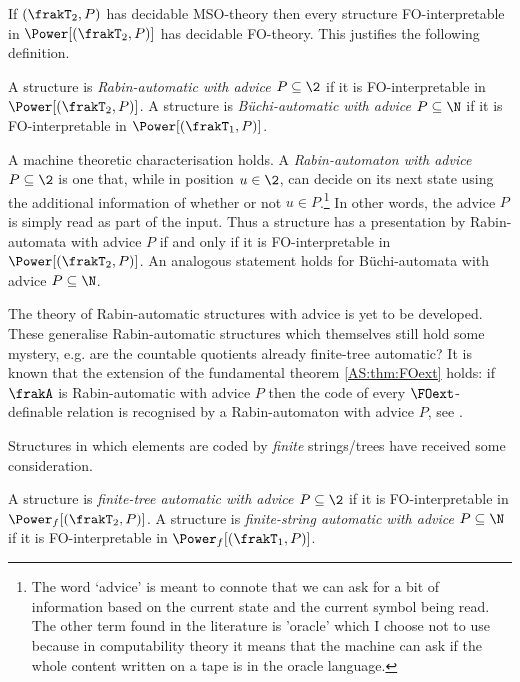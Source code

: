 If $(\frakT_2,P)$ has decidable MSO-theory then every structure FO-interpretable in $\Power[(\frakT_2,P)]$ has decidable FO-theory. This justifies
the following definition.

\begin{definition} \cite{CoLo07}
A structure is  {\em Rabin-automatic with advice $P \subseteq \2$} if it is FO-interpretable in $\Power[(\frakT_2,P)]$.
A structure is  {\em B\"uchi-automatic with advice $P \subseteq \N$}  if it is FO-interpretable in $\Power[(\frakT_1,P)]$.
\end{definition}

A machine theoretic characterisation holds. A {\em Rabin-automaton with
advice $P \subseteq \2$} is one that, while in position $u \in \2$, can decide on its next
state using the additional information of whether or not $u \in P$.\footnote{The word `advice' is meant to connote that we can ask for a bit of information based on the current state and the current symbol being read. The other term found in the literature is 'oracle' which I choose not to use because in computability theory it means that the machine can ask if the whole content written on a tape is in the oracle language.}  In other words, the advice $P$ is simply read as part
of the input. Thus a structure has a presentation by Rabin-automata with advice $P$ if and only if it is FO-interpretable in $\Power[(\frakT_2,P)]$. An analogous statement holds for B\"uchi-automata with advice $P \subseteq \N$.


The theory of Rabin-automatic structures with advice is yet to be developed. These generalise Rabin-automatic structures which themselves still hold some mystery, e.g. are the countable quotients already finite-tree automatic? It is known that the extension of the fundamental theorem \ref{AS:thm:FOext} holds: if $\frakA$ is Rabin-automatic with advice $P$ then the code of every $\FOext$-definable relation is recognised by a Rabin-automaton with advice $P$, see \cite{BKRa}. 

Structures in which elements are coded by {\em finite} strings/trees have received some consideration. 

\begin{definition} \cite{CoLo07}
A structure is  {\em finite-tree automatic with advice $P \subseteq \2$} if it is FO-interpretable in $\Power_f[(\frakT_2,P)]$.
A structure is  {\em finite-string automatic with advice $P \subseteq \N$}  if it is FO-interpretable in $\Power_f[(\frakT_1,P)]$.
\end{definition}

